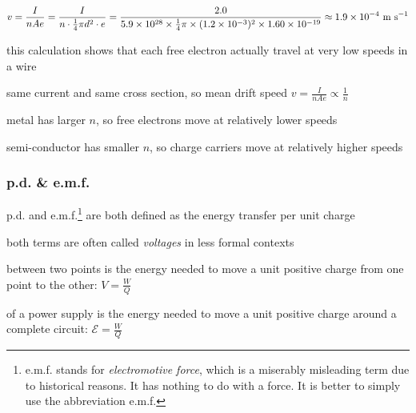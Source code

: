 
\solc\begin{equation*}
v = \frac{I}{nAe} = \frac{I}{n\cdot\frac{1}{4} \pi d^2 \cdot e} = \frac{2.0}{5.9\times10^{28} \times \frac{1}{4}\pi \times (1.2\times10^{-3})^2\times1.60\times10^{-19}} \approx 1.9\times10^{-4} \text{ m s$^{-1}$}
\end{equation*}

\eqyskip this calculation shows that each free electron actually travel at very low speeds in a wire \eoe


\sol same current and same cross section, so mean drift speed $ v = \frac{I}{nAe} \propto \frac{1}{n}$

metal has larger $n$, so free electrons move at relatively lower speeds

semi-conductor has smaller $n$, so charge carriers move at relatively higher speeds \eoe




\subsubsection{p.d. \& e.m.f.}\label{ch:potential-difference}

p.d. and e.m.f.\footnote{e.m.f. stands for \emph{electromotive force}, which is a miserably misleading term due to historical reasons. It has nothing to do with a force. It is better to simply use the abbreviation e.m.f.} are both defined as the energy transfer per unit charge

both terms are often called \emph{voltages} in less formal contexts

\begin{ilight}
	 between two points is the energy needed to move a unit positive charge from one point to the other: $\boxed{V=\frac{W}{Q}} $ 
\end{ilight}

\begin{ilight}
	 of a power supply is the energy needed to move a unit positive charge around a complete circuit: $\boxed{\mathcal{E}=\frac{W}{Q}} $ 
\end{ilight}


